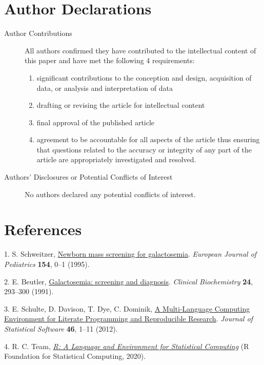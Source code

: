 \documentclass[review]{elsarticle}
\begin{document}
\section*{Author Declarations}
\label{sec:org1dcf0ea}
\begin{description}
\item[{Author Contributions}] All authors confirmed they have contributed
to the intellectual content of this paper and have met the following
4 requirements:
\begin{enumerate}
\item significant contributions to the conception and design, acquisition of data, or analysis and interpretation of data
\item drafting or revising the article for intellectual content
\item final approval of the published article
\item agreement to be accountable for all aspects of the article thus
ensuring that questions related to the accuracy or integrity of
any part of the article are appropriately investigated and
resolved.
\end{enumerate}

\item[{Authors’ Disclosures or Potential Conflicts of Interest}] No authors declared any potential conflicts of interest.
\end{description}
\section*{References}
\label{sec:orgd1e2d0e}
\hypertarget{citeproc_bib_item_1}{1.  S. Schweitzer, \href{https://doi.org/10.1007/BF02143801}{Newborn mass screening for galactosemia}. \textit{European Journal of Pediatrics} \textbf{154}, 0–1 (1995).}

\hypertarget{citeproc_bib_item_2}{2.  E. Beutler, \href{https://doi.org/10.1016/0009-9120(91)80003-L}{Galactosemia: screening and diagnosis}. \textit{Clinical Biochemistry} \textbf{24}, 293–300 (1991).}

\hypertarget{citeproc_bib_item_3}{3.  E. Schulte, D. Davison, T. Dye, C. Dominik, \href{https://doi.org/10.18637/jss.v046.i03}{A Multi-Language Computing Environment for Literate Programming and Reproducible Research}. \textit{Journal of Statistical Software} \textbf{46}, 1–11 (2012).}

\hypertarget{citeproc_bib_item_4}{4.  R. C. Team, \textit{\href{https://www.R-project.org/}{R: A Language and Environment for Statistical Computing}} (R Foundation for Statistical Computing, 2020).}
\end{document}
